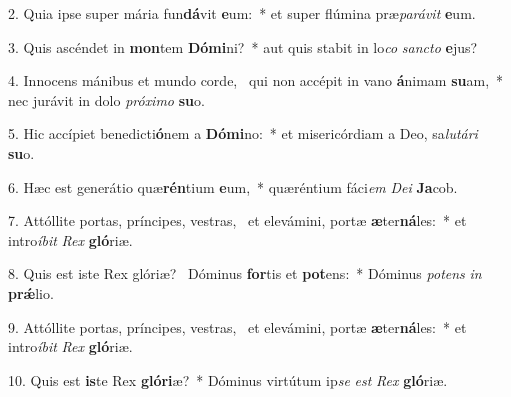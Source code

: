 2. Quia ipse super mária fun\textbf{dá}vit \textbf{e}um:~*  et super flúmina præ\textit{pa}\textit{rá}\textit{vit} \textbf{e}um.\

3. Quis ascéndet in \textbf{mon}tem \textbf{Dó}\textbf{mi}ni?~*  aut quis stabit in lo\textit{co} \textit{sanc}\textit{to} \textbf{e}jus?\

4. Innocens mánibus et mundo corde, \dag\  qui non accépit in vano \textbf{á}nimam \textbf{su}am,~*  nec jurávit in dolo \textit{pró}\textit{xi}\textit{mo} \textbf{su}o.\

5. Hic accípiet benedicti\textbf{ó}nem a \textbf{Dó}\textbf{mi}no:~*  et misericórdiam a Deo, sa\textit{lu}\textit{tá}\textit{ri} \textbf{su}o.\

6. Hæc est generátio quæ\textbf{rén}tium \textbf{e}um,~*  quæréntium fáci\textit{em} \textit{De}\textit{i} \textbf{Ja}cob.\

7. Attóllite portas, príncipes, vestras, \dag\  et elevámini, portæ \textbf{æ}ter\textbf{ná}les:~*  et intro\textit{í}\textit{bit} \textit{Rex} \textbf{gló}riæ.\

8. Quis est iste Rex glóriæ? \dag\  Dóminus \textbf{for}tis et \textbf{pot}ens:~*  Dóminus \textit{pot}\textit{ens} \textit{in} \textbf{prǽ}lio.\

9. Attóllite portas, príncipes, vestras, \dag\  et elevámini, portæ \textbf{æ}ter\textbf{ná}les:~*  et intro\textit{í}\textit{bit} \textit{Rex} \textbf{gló}riæ.\

10. Quis est \textbf{is}te Rex \textbf{gló}\textbf{ri}æ?~*  Dóminus virtútum ip\textit{se} \textit{est} \textit{Rex} \textbf{gló}riæ.\

